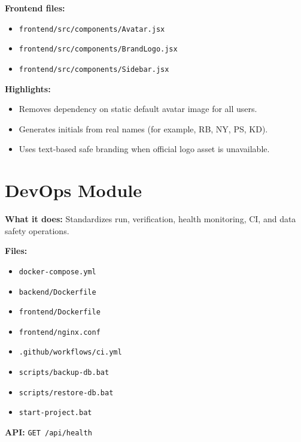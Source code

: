 \textbf{Frontend files:}
\begin{itemize}[leftmargin=1.3cm]
\item \texttt{frontend/src/components/Avatar.jsx}
\item \texttt{frontend/src/components/BrandLogo.jsx}
\item \texttt{frontend/src/components/Sidebar.jsx}
\end{itemize}

\textbf{Highlights:}
\begin{itemize}[leftmargin=1.3cm]
\item Removes dependency on static default avatar image for all users.
\item Generates initials from real names (for example, RB, NY, PS, KD).
\item Uses text-based safe branding when official logo asset is unavailable.
\end{itemize}

\section{DevOps Module}
\textbf{What it does:} Standardizes run, verification, health monitoring, CI, and data safety operations.

\textbf{Files:}
\begin{itemize}[leftmargin=1.3cm]
\item \texttt{docker-compose.yml}
\item \texttt{backend/Dockerfile}
\item \texttt{frontend/Dockerfile}
\item \texttt{frontend/nginx.conf}
\item \texttt{.github/workflows/ci.yml}
\item \texttt{scripts/backup-db.bat}
\item \texttt{scripts/restore-db.bat}
\item \texttt{start-project.bat}
\end{itemize}

\textbf{API:} \texttt{GET /api/health}
